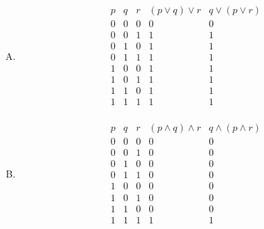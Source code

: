 {{        %
        \begin{practices}
            \begin{enumerate}[A.]
                \item
                {
                    \begin{table}[H]
                        \[
                            \begin{array}{c|c|c|c|c}
                                \hline
                                p & q & r & (p \vee q) \vee r & q \vee (p \vee r) \\
                                \hline
                                0 & 0 & 0 & 0 & 0 \\
                                0 & 0 & 1 & 1 & 1 \\
                                0 & 1 & 0 & 1 & 1 \\
                                0 & 1 & 1 & 1 & 1 \\
                                1 & 0 & 0 & 1 & 1 \\
                                1 & 0 & 1 & 1 & 1 \\
                                1 & 1 & 0 & 1 & 1 \\
                                1 & 1 & 1 & 1 & 1 \\
                            \end{array}
                        \]
                    \end{table}
                }
                \item
                {
                    \begin{table}[H]
                        \[
                            \begin{array}{c|c|c|c|c}
                                \hline
                                p & q & r & (p \wedge q) \wedge r & q \wedge (p \wedge r) \\
                                \hline
                                0 & 0 & 0 & 0 & 0 \\
                                0 & 0 & 1 & 0 & 0 \\
                                0 & 1 & 0 & 0 & 0 \\
                                0 & 1 & 1 & 0 & 0 \\
                                1 & 0 & 0 & 0 & 0 \\
                                1 & 0 & 1 & 0 & 0 \\
                                1 & 1 & 0 & 0 & 0 \\
                                1 & 1 & 1 & 1 & 1 \\
                            \end{array}
                        \]
                    \end{table}
                }
            \end{enumerate}
        \end{practices}

}}
